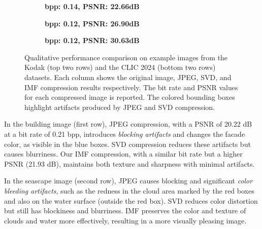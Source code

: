 \begin{figure*}[!t]
    \begin{subfigure}[t]{.25\textwidth}
        \centering
    \end{subfigure}%
    \begin{subfigure}[t]{.25\textwidth}
        \centering
        \caption{\scriptsize\textbf{bpp: 0.14, PSNR: 22.66dB}}
    \end{subfigure}%
    \begin{subfigure}[t]{.25\textwidth}
        \centering
        \caption{\scriptsize\textbf{bpp: 0.12, PSNR: 26.90dB}}
    \end{subfigure}%
    \begin{subfigure}[t]{.25\textwidth}
        \centering
        \caption{\scriptsize\textbf{bpp: 0.12, PSNR: 30.63dB}}
    \end{subfigure}

    \caption{Qualitative performance comparison on example images from the Kodak (top two rows) and the CLIC 2024 (bottom two rows) datasets. Each column shows the original image, JPEG, SVD, and IMF compression results respectively. The bit rate and PSNR values for each compressed image is reported. The colored bounding boxes highlight artifacts produced by JPEG and SVD compression.}
    \label{fig:qualitative_comparison}
\end{figure*}

In the building image (first row), JPEG compression, with a PSNR of 20.22 dB at a bit rate of 0.21 bpp, introduces \emph{blocking artifacts} and changes the facade color, as visible in the blue boxes. SVD compression reduces these artifacts but causes blurriness. Our IMF compression, with a similar bit rate but a higher PSNR (21.93 dB), maintains both texture and sharpness with minimal artifacts.

In the seascape image (second row), JPEG causes blocking and significant \emph{color bleeding artifacts}, such as the redness in the cloud area marked by the red boxes and also on the water surface (outside the red box). SVD reduces color distortion but still has blockiness and blurriness. IMF preserves the color and texture of clouds and water more effectively, resulting in a more visually pleasing image.

